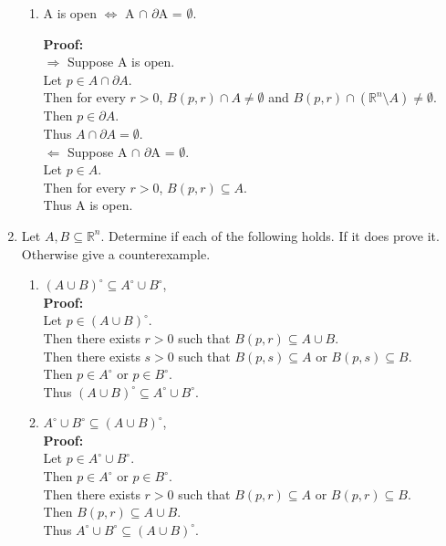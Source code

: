 \documentclass{article}
\begin{document}
\begin{enumerate}
\begin{enumerate}
    \item A is open $\Leftrightarrow$ A $\cap$ $\partial$A = $\emptyset$.

\textbf{Proof:} \\
$\Rightarrow$ Suppose A is open. \\
Let $p \in A \cap \partial A$. \\
Then for every $r > 0$, $B(p,r) \cap A \neq \emptyset$ and $B(p,r) \cap (\mathbb{R}^n \setminus A) \neq \emptyset$. \\
Then $p \in \partial A$. \\
Thus $A \cap \partial A = \emptyset$.\\
$\Leftarrow$ Suppose A $\cap$ $\partial$A = $\emptyset$. \\
Let $p \in A$. \\
Then for every $r > 0$, $B(p,r) \subseteq A$. \\
Thus A is open.\\

    


\end{enumerate} 
\item  Let $A,B \subseteq \mathbb{R}^n$. Determine if each of the following holds. If it does prove it. Otherwise give a counterexample.
\begin{enumerate}
    \item $(A \cup B)^\circ \subseteq A^\circ \cup B^\circ$, \\
    
\textbf{Proof:} \\
Let $p \in (A \cup B)^\circ$. \\
Then there exists $r > 0$ such that $B(p,r) \subseteq A \cup B$. \\
Then there exists $s > 0$ such that $B(p,s) \subseteq A$ or $B(p,s) \subseteq B$. \\
Then $p \in A^\circ$ or $p \in B^\circ$. \\
Thus $(A \cup B)^\circ \subseteq A^\circ \cup B^\circ$.\\


    \item  $A^\circ \cup B^\circ \subseteq (A \cup B)^\circ$, \\
    
\textbf{Proof:} \\
Let $p \in A^\circ \cup B^\circ$. \\
Then $p \in A^\circ$ or $p \in B^\circ$. \\
Then there exists $r > 0$ such that $B(p,r) \subseteq A$ or $B(p,r) \subseteq B$. \\
Then $B(p,r) \subseteq A \cup B$. \\
Thus $A^\circ \cup B^\circ \subseteq (A \cup B)^\circ$.\\


\end{enumerate}
\end{enumerate}
\end{document}
